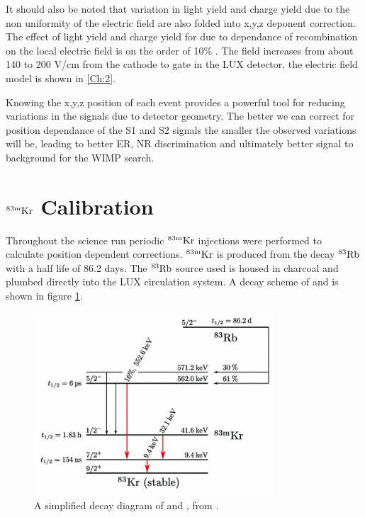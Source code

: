 It should also be noted that variation in light yield and charge yield due to the non uniformity of the electric field are also folded into x,y,z deponent correction. The effect of light yield and charge yield for \KrCal due to dependance of recombination on the local electric field is on the order of 10\% \cite{NEST_2013}. The field increases from about 140 to 200 V/cm from the cathode to gate in the LUX detector, the electric field model is shown in \ref{Ch:2}.

Knowing the x,y,z position of each event provides a powerful tool for reducing variations in the signals due to detector geometry. The better we can correct for position dependance of the S1 and S2 signals the smaller the observed variations will be, leading to better ER, NR discrimination and ultimately better signal to background for the WIMP search. 

\section{$\rm^{83m}Kr$ Calibration}

Throughout the science run periodic $\rm^{83m}Kr$ injections were performed to calculate position dependent corrections. $\rm ^{83m}Kr$ is produced from the decay $\rm^{83}Rb$ with a half life of 86.2 days. The $\rm^{83}Rb$ source used is housed in charcoal and plumbed directly into the LUX circulation system.  A decay scheme of \Rb and \KrCal is shown in figure \ref{fig:Kr_Decay}.

\begin{figure}[h!]\centering
\includegraphics[width=90mm]{Chapter_XYZ_Corr/Thesis_Corr_Plots/RbKr_83_Decay.png}
\caption{A simplified decay diagram of \Rb and \KrCal, from \cite{Kr_Decay_Diagram}.}
\label{fig:Kr_Decay}
\end{figure}

